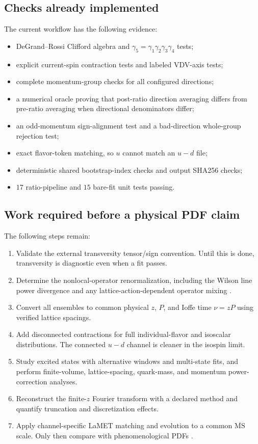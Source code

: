 \documentclass[11pt]{article}
\numberwithin{equation}{section}
\newcommand{\MSbar}{\overline{\mathrm{MS}}}
\begin{document}
\subsection{Checks already implemented}

The current workflow has the following evidence:
\begin{itemize}
  \item DeGrand--Rossi Clifford algebra and
        $\gamma_5=\gamma_1\gamma_2\gamma_3\gamma_4$ tests;
  \item explicit current-spin contraction tests and labeled VDV-axis tests;
  \item complete momentum-group checks for all configured directions;
  \item a numerical oracle proving that post-ratio direction averaging differs
        from pre-ratio averaging when directional denominators differ;
  \item an odd-momentum sign-alignment test and a bad-direction whole-group
        rejection test;
  \item exact flavor-token matching, so $u$ cannot match an $u-d$ file;
  \item deterministic shared bootstrap-index checks and output SHA256 checks;
  \item $17$ ratio-pipeline and $15$ bare-fit unit tests passing.
\end{itemize}

\subsection{Work required before a physical PDF claim}

The following steps remain:
\begin{enumerate}
  \item Validate the external transversity tensor/sign convention.  Until this
        is done, transversity is diagnostic even when a fit passes.
  \item Determine the nonlocal-operator renormalization, including the Wilson
        line power divergence and any lattice-action-dependent operator mixing
        \cite{ConstantinouPanagopoulos2017,Ishikawa2017,Chen2018}.
  \item Convert all ensembles to common physical $z$, $P$, and Ioffe time
        $\nu=zP$ using verified lattice spacings.
  \item Add disconnected contractions for full individual-flavor and isoscalar
        distributions.  The connected $u-d$ channel is cleaner in the isospin
        limit.
  \item Study excited states with alternative windows and multi-state fits,
        and perform finite-volume, lattice-spacing, quark-mass, and momentum
        power-correction analyses.
  \item Reconstruct the finite-$z$ Fourier transform with a declared method and
        quantify truncation and discretization effects.
  \item Apply channel-specific LaMET matching and evolution to a common
        $\MSbar$ scale.  Only then compare with phenomenological PDFs
        \cite{Alexandrou2018,Lin2018,CichyConstantinou2019}.
\end{enumerate}
\end{document}
